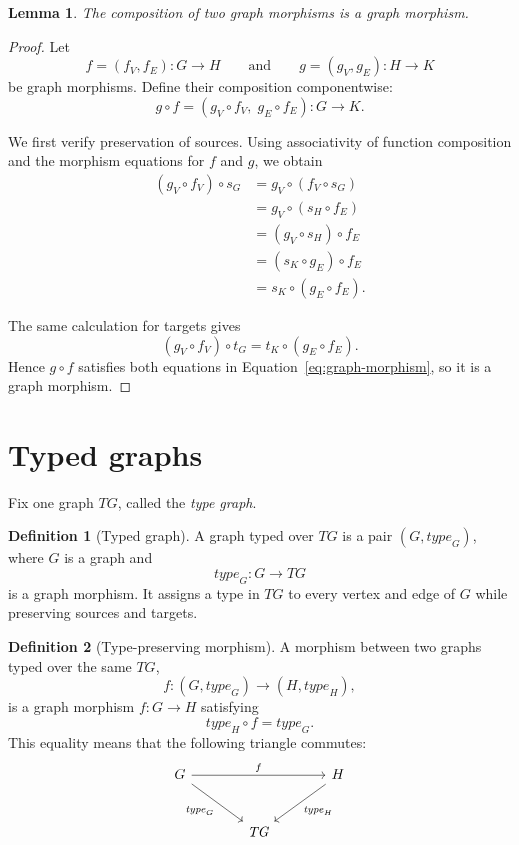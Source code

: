 \documentclass[10pt,a4paper]{article}
\newtheorem{lemma}{Lemma}
\theoremstyle{definition}
\newtheorem{definition}{Definition}
\newcommand{\TG}{\mathit{TG}}
\newcommand{\type}{\mathit{type}}
\begin{document}
\begin{lemma}
The composition of two graph morphisms is a graph morphism.
\end{lemma}

\begin{proof}
Let
\[
    f=(f_V,f_E):G\to H
    \qquad\text{and}\qquad
    g=(g_V,g_E):H\to K
\]
be graph morphisms. Define their composition componentwise:
\[
    g\circ f=(g_V\circ f_V,\;g_E\circ f_E):G\to K.
\]

We first verify preservation of sources. Using associativity of function
composition and the morphism equations for $f$ and $g$, we obtain
\begin{align*}
 (g_V\circ f_V)\circ s_G
 &=g_V\circ(f_V\circ s_G)\\
 &=g_V\circ(s_H\circ f_E)\\
 &=(g_V\circ s_H)\circ f_E\\
 &=(s_K\circ g_E)\circ f_E\\
 &=s_K\circ(g_E\circ f_E).
\end{align*}

The same calculation for targets gives
\[
    (g_V\circ f_V)\circ t_G
    =t_K\circ(g_E\circ f_E).
\]
Hence $g\circ f$ satisfies both equations in
Equation~\ref{eq:graph-morphism}, so it is a graph morphism.
\end{proof}

\section{Typed graphs}

Fix one graph $\TG$, called the \emph{type graph}.

\begin{definition}[Typed graph]
A graph typed over $\TG$ is a pair $(G,\type_G)$, where $G$ is a graph and
\[
    \type_G:G\to\TG
\]
is a graph morphism. It assigns a type in $\TG$ to every vertex and edge of
$G$ while preserving sources and targets.
\end{definition}

\begin{definition}[Type-preserving morphism]
A morphism between two graphs typed over the same $\TG$,
\[
    f:(G,\type_G)\to(H,\type_H),
\]
is a graph morphism $f:G\to H$ satisfying
\begin{equation}
    \type_H\circ f=\type_G.
    \label{eq:type-preservation}
\end{equation}
This equality means that the following triangle commutes:
\[
\begin{tikzcd}[column sep=large,row sep=large]
G \arrow[rr,"f"] \arrow[dr,swap,"\type_G"]
  & & H \arrow[dl,"\type_H"] \\
  & \TG &
\end{tikzcd}
\]
\end{definition}
\end{document}
